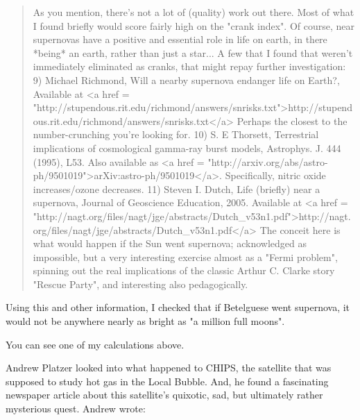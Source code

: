 \begin{quote}
  As you mention, there's not a lot of (quality) work out there.  Most of
  what I found briefly would score fairly high on the "crank index".
  Of course, near supernovas have a positive and essential role in life on
  earth, in there *being* an earth, rather than just a star...
  A few that I found that weren't immediately eliminated as cranks, that
  might repay further investigation:
  9) Michael Richmond, Will a nearby supernova endanger life on Earth?,
  Available at <a href = "http://stupendous.rit.edu/richmond/answers/snrisks.txt">http://stupendous.rit.edu/richmond/answers/snrisks.txt</a>
  Perhaps the closest to the number-crunching you're looking for.
  10) S. E Thorsett, Terrestrial implications of cosmological gamma-ray 
  burst models, Astrophys. J. 444 (1995), L53.
  Also available as <a href = "http://arxiv.org/abs/astro-ph/9501019">arXiv:astro-ph/9501019</a>.
  Specifically, nitric oxide increases/ozone decreases.
  11) Steven I. Dutch, Life (briefly) near a supernova, Journal
  of Geoscience Education, 2005.  Available at 
  <a href = "http://nagt.org/files/nagt/jge/abstracts/Dutch_v53n1.pdf">http://nagt.org/files/nagt/jge/abstracts/Dutch_v53n1.pdf</a>
  The conceit here is what would happen if the Sun went supernova; 
  acknowledged as impossible, but a very interesting exercise almost 
  as a "Fermi problem", spinning out the real implications of the 
  classic Arthur C. Clarke story "Rescue Party", and interesting also 
  pedagogically.
\end{quote}
    

Using this and other information, I checked that if Betelguese went
supernova, it would not be anywhere nearly as bright as "a
million full moons".

You can see one of my calculations above.

Andrew Platzer looked into what happened to CHIPS, the satellite that
was supposed to study hot gas in the Local Bubble.  And, he found a
fascinating newspaper article about this satellite's quixotic, sad, 
but ultimately rather mysterious quest.  Andrew wrote:



